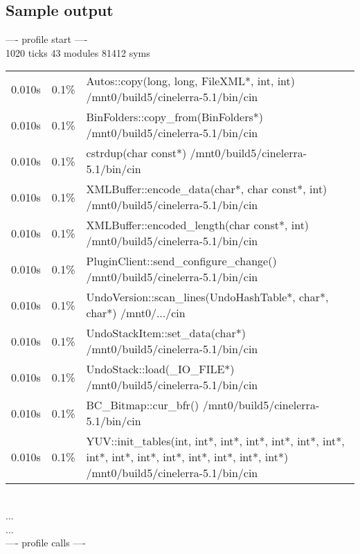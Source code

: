 \subsection{Sample output}

\medskip


---- profile start ----\\
1020 ticks 43 modules 81412 syms\\
\begin{tabular}{@{}rrp{\linewidth-6em}}
 0.010s & 0.1\% & Autos::copy(long, long, FileXML*, int, int) /mnt0/build5/cinelerra-5.1/bin/cin\\
 0.010s & 0.1\% & BinFolders::copy\_from(BinFolders*) /mnt0/build5/cinelerra-5.1/bin/cin\\
 0.010s & 0.1\% & cstrdup(char const*)     /mnt0/build5/cinelerra-5.1/bin/cin\\
 0.010s & 0.1\% & XMLBuffer::encode\_data(char*, char const*, int) /mnt0/build5/cinelerra-5.1/bin/cin\\
 0.010s & 0.1\% & XMLBuffer::encoded\_length(char const*, int) /mnt0/build5/cinelerra-5.1/bin/cin\\
 0.010s & 0.1\% & PluginClient::send\_configure\_change() /mnt0/build5/cinelerra-5.1/bin/cin\\
 0.010s & 0.1\% & UndoVersion::scan\_lines(UndoHashTable*, char*, char*) /mnt0/.../cin\\
 0.010s & 0.1\% & UndoStackItem::set\_data(char*) /mnt0/build5/cinelerra-5.1/bin/cin\\
 0.010s & 0.1\% & UndoStack::load(\_IO\_FILE*) /mnt0/build5/cinelerra-5.1/bin/cin\\
 0.010s & 0.1\% & BC\_Bitmap::cur\_bfr()     /mnt0/build5/cinelerra-5.1/bin/cin\\
 0.010s & 0.1\% & YUV::init\_tables(int, int*, int*, int*, int*, int*, int*, int*, int*, int*, int*, int*, int*, int*, int*) /mnt0/build5/cinelerra-5.1/bin/cin\\
\end{tabular}\\
...\\
...\\
---- profile calls ----\\
